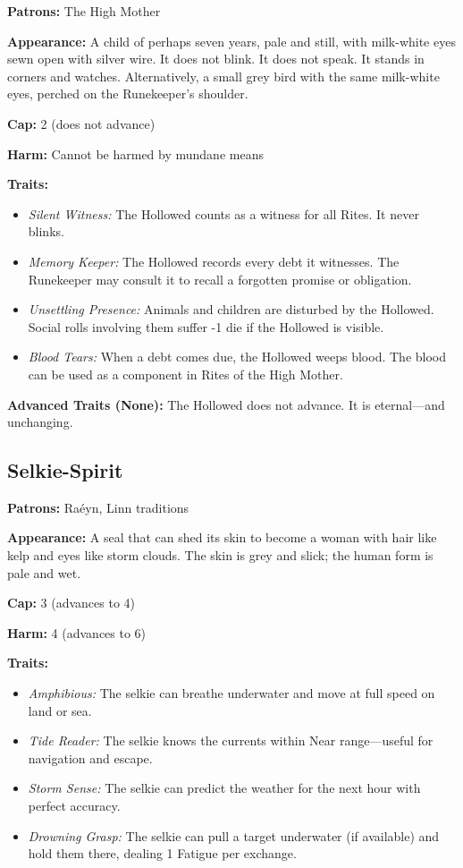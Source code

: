 \noindent\textbf{Patrons:} The High Mother

\noindent\textbf{Appearance:} A child of perhaps seven years, pale and still, with milk-white eyes sewn open with silver wire. It does not blink. It does not speak. It stands in corners and watches. Alternatively, a small grey bird with the same milk-white eyes, perched on the Runekeeper's shoulder.

\noindent\textbf{Cap:} 2 (does not advance)

\noindent\textbf{Harm:} Cannot be harmed by mundane means

\noindent\textbf{Traits:}

\begin{itemize}
\item \textit{Silent Witness:} The Hollowed counts as a witness for all Rites. It never blinks.
\item \textit{Memory Keeper:} The Hollowed records every debt it witnesses. The Runekeeper may consult it to recall a forgotten promise or obligation.
\item \textit{Unsettling Presence:} Animals and children are disturbed by the Hollowed. Social rolls involving them suffer -1 die if the Hollowed is visible.
\item \textit{Blood Tears:} When a debt comes due, the Hollowed weeps blood. The blood can be used as a component in Rites of the High Mother.
\end{itemize}

\noindent\textbf{Advanced Traits (None):} The Hollowed does not advance. It is eternal—and unchanging.

\subsection{Selkie-Spirit}

\noindent\textbf{Patrons:} Raéyn, Linn traditions

\noindent\textbf{Appearance:} A seal that can shed its skin to become a woman with hair like kelp and eyes like storm clouds. The skin is grey and slick; the human form is pale and wet.

\noindent\textbf{Cap:} 3 (advances to 4)

\noindent\textbf{Harm:} 4 (advances to 6)

\noindent\textbf{Traits:}

\begin{itemize}
\item \textit{Amphibious:} The selkie can breathe underwater and move at full speed on land or sea.
\item \textit{Tide Reader:} The selkie knows the currents within Near range—useful for navigation and escape.
\item \textit{Storm Sense:} The selkie can predict the weather for the next hour with perfect accuracy.
\item \textit{Drowning Grasp:} The selkie can pull a target underwater (if available) and hold them there, dealing 1 Fatigue per exchange.
\end{itemize}

